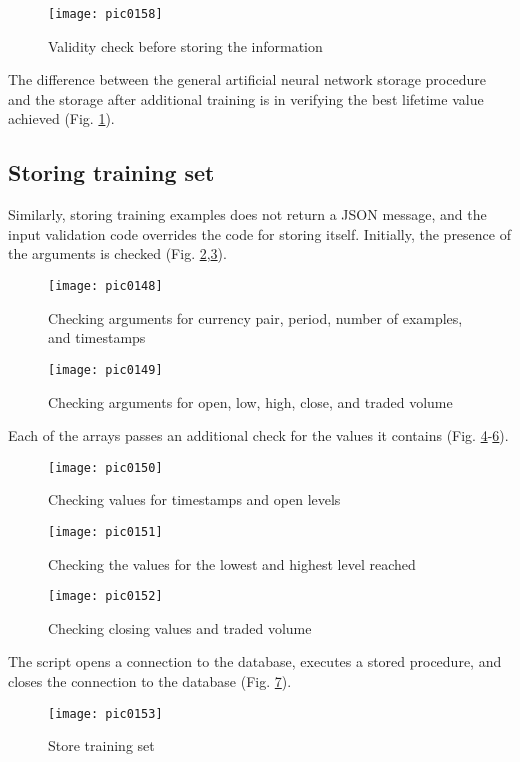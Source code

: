 \begin{figure}[h]
\centering
\texttt{[image: pic0158]}
\caption{Validity check before storing the information}
\label{fig:pic0158}
\end{figure}
\FloatBarrier

The difference between the general artificial neural network storage procedure and the storage after additional training is in verifying the best lifetime value achieved (Fig. \ref{fig:pic0158}).

\subsection{Storing training set}

Similarly, storing training examples does not return a JSON message, and the input validation code overrides the code for storing itself. Initially, the presence of the arguments is checked (Fig. \ref{fig:pic0148},\ref{fig:pic0149}).

\begin{figure}[h]
\centering
\texttt{[image: pic0148]}
\caption{Checking arguments for currency pair, period, number of examples, and timestamps}
\label{fig:pic0148}
\end{figure}
\FloatBarrier

\begin{figure}[h]
\centering
\texttt{[image: pic0149]}
\caption{Checking arguments for open, low, high, close, and traded volume}
\label{fig:pic0149}
\end{figure}
\FloatBarrier

Each of the arrays passes an additional check for the values it contains (Fig. \ref{fig:pic0150}-\ref{fig:pic0152}).

\begin{figure}[h]
\centering
\texttt{[image: pic0150]}
\caption{Checking values for timestamps and open levels}
\label{fig:pic0150}
\end{figure}
\FloatBarrier

\begin{figure}[h]
\centering
\texttt{[image: pic0151]}
\caption{Checking the values for the lowest and highest level reached}
\label{fig:pic0151}
\end{figure}
\FloatBarrier

\begin{figure}[h]
\centering
\texttt{[image: pic0152]}
\caption{Checking closing values and traded volume}
\label{fig:pic0152}
\end{figure}
\FloatBarrier

The script opens a connection to the database, executes a stored procedure, and closes the connection to the database (Fig. \ref{fig:pic0153}).

\begin{figure}[h]
\centering
\texttt{[image: pic0153]}
\caption{Store training set}
\label{fig:pic0153}
\end{figure}
\FloatBarrier
